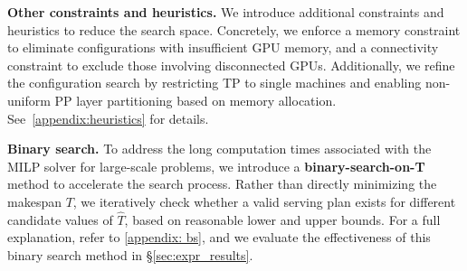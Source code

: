 \textbf{Other constraints and heuristics.} We introduce additional constraints and heuristics to reduce the search space. Concretely, we enforce a memory constraint to eliminate configurations with insufficient GPU memory, and a connectivity constraint to exclude those involving disconnected GPUs. Additionally, we refine the configuration search by restricting TP to single machines and enabling non-uniform PP layer partitioning based on memory allocation. See~\autoref{appendix:heuristics} for details.



\textbf{Binary search.} To address the long computation times associated with the MILP solver for large-scale problems, we introduce a \textbf{binary-search-on-T} method to accelerate the search process. Rather than directly minimizing the makespan $T$, we iteratively check whether a valid serving plan exists for different candidate values of $\hat{T}$, based on reasonable lower and upper bounds. For a full explanation, refer to \autoref{appendix: bs}, and we evaluate the effectiveness of this binary search method in \S\ref{sec:expr_results}.

